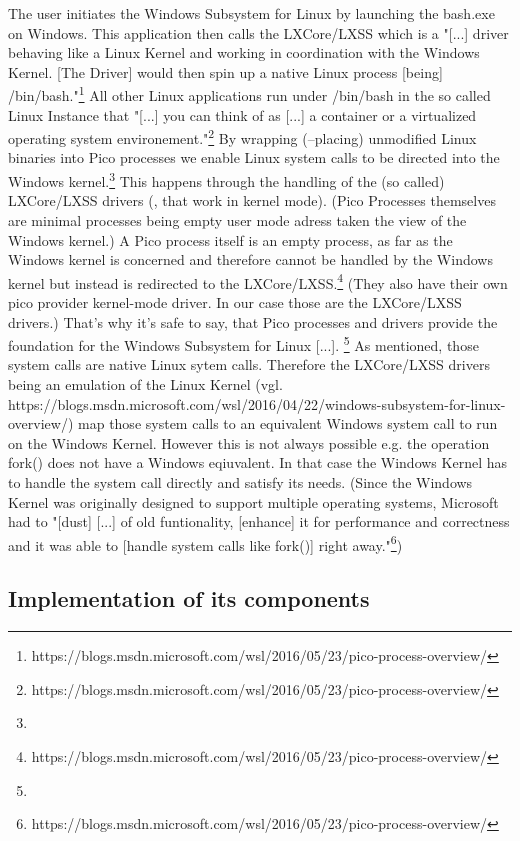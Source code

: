 \documentclass[utf8,biblatex]{lni}
\begin{document}
The user initiates the Windows Subsystem for Linux by launching the bash.exe on Windows. This application then calls the LXCore/LXSS which is a "[...] driver behaving like a Linux Kernel and working in coordination with the Windows Kernel. [The Driver] would then spin up a native Linux process [being] /bin/bash."\footnote{https://blogs.msdn.microsoft.com/wsl/2016/05/23/pico-process-overview/} All other Linux applications run under /bin/bash in the so called Linux Instance that "[...] you can think of as [...] a container or a virtualized operating system environement."\footnote{https://blogs.msdn.microsoft.com/wsl/2016/05/23/pico-process-overview/}
\glqq By wrapping (--placing) unmodified Linux binaries into Pico processes we enable Linux system calls to be directed into the Windows kernel.\grqq \footnote{} This happens through the handling of the (so called) LXCore/LXSS drivers (, that work in kernel mode). 
(Pico Processes themselves are minimal processes being empty user mode adress taken the view of the Windows kernel.)
A Pico process itself is an empty process, as far as the Windows kernel is concerned and therefore cannot be handled by the Windows kernel but instead is redirected to the LXCore/LXSS.\footnote{https://blogs.msdn.microsoft.com/wsl/2016/05/23/pico-process-overview/}
(They also have their own pico provider kernel-mode driver. In our case those are the LXCore/LXSS drivers.) 
That's why it's safe to say, that \glqq Pico processes and drivers provide the foundation for the Windows Subsystem for Linux [...]. \grqq \footnote{}
As mentioned, those system calls are native Linux sytem calls. Therefore the LXCore/LXSS drivers being an emulation of the Linux Kernel (vgl. https://blogs.msdn.microsoft.com/wsl/2016/04/22/windows-subsystem-for-linux-overview/) map those system calls to an equivalent Windows system call to run on the Windows Kernel. However this is not always possible e.g. the operation fork() does not have a Windows eqiuvalent. In that case the Windows Kernel has to handle the system call directly and satisfy its needs. (Since the Windows Kernel was originally designed to support multiple operating systems, Microsoft had to "[dust] [...] of old funtionality, [enhance] it for performance and correctness and it was able to [handle system calls like fork()] right away."\footnote{https://blogs.msdn.microsoft.com/wsl/2016/05/23/pico-process-overview/})

\subsection{Implementation of its components}
\end{document}
